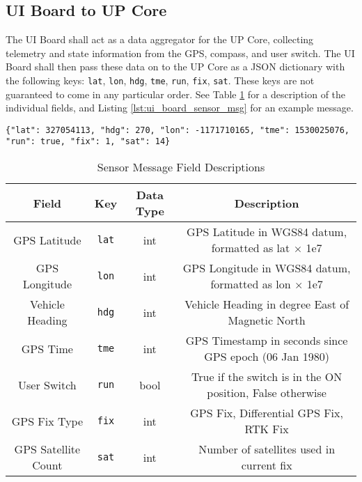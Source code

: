 \documentclass{report}
\begin{document}
			\subsection{UI Board to UP Core}\label{ssec:ui_obc_msg}
				The UI Board shall act as a data aggregator for the UP Core, collecting telemetry and state information from the GPS, compass, and user switch.  The UI Board shall then pass these data on to the UP Core as a JSON dictionary with the following keys: \lstinline{lat}, \lstinline{lon}, \lstinline{hdg}, \lstinline{tme}, \lstinline{run}, \lstinline{fix}, \lstinline{sat}.  These keys are not guaranteed to come in any particular order.  See Table \ref{tbl:ui_board_sensor_fields} for a description of the individual fields, and Listing \ref{lst:ui_board_sensor_msg} for an example message.

				\begin{lstlisting}[caption={UI Board Sensor Message}, label={lst:ui_board_sensor_msg}]
{"lat": 327054113, "hdg": 270, "lon": -1171710165, "tme": 1530025076, "run": true, "fix": 1, "sat": 14}
				\end{lstlisting}

				\begin{table}[htp]
					\centering
					\caption{Sensor Message Field Descriptions}
					\label{tbl:ui_board_sensor_fields}
					\begin{tabular}{c|c|c|c}
						Field & Key & Data Type & Description\\\hline
						GPS Latitude & \lstinline'lat' & int & GPS Latitude in WGS84 datum, formatted as lat $\times$ 1e7\\
						GPS Longitude & \lstinline'lon' & int & GPS Longitude in WGS84 datum, formatted as lon $\times$ 1e7\\
						Vehicle Heading & \lstinline'hdg' & int & Vehicle Heading in degree East of Magnetic North\\
						GPS Time & \lstinline'tme' & int & GPS Timestamp in seconds since GPS epoch (06 Jan 1980)\\
						User Switch & \lstinline'run' & bool & True if the switch is in the ON position, False otherwise\\
						GPS Fix Type & \lstinline'fix' & int & GPS Fix, Differential GPS Fix, RTK Fix\\%
						GPS Satellite Count & \lstinline'sat' & int & Number of satellites used in current fix
					\end{tabular}
				\end{table}
\end{document}
